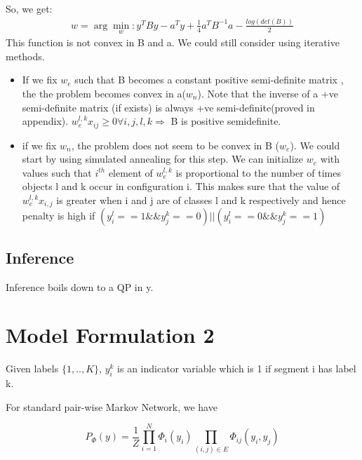\documentclass[11pt,a4paper,oneside]{report}
\begin{document}
So, we get:
\begin{eqnarray}
w=\arg\min_{w}:y^T B y-a^T y +\frac{1}{4}a^T B^{-1} a-\frac{log(det(B))}{2}
\end{eqnarray}
This function is not convex in B and a. We could still consider using iterative methods.

\begin{itemize}
\item If we fix $w_e$ such that B becomes a constant positive semi-definite matrix , the the problem becomes convex in a($w_n$). Note that the inverse of a +ve semi-definite matrix (if exists) is always +ve semi-definite(proved in appendix). $w_e^{l,k}x_{ij} \ge 0 \forall i,j,l,k \Rightarrow$ B is positive semidefinite.
\item if we fix $w_n$, the problem does not seem to be convex in B ($w_e$). We could start by using simulated annealing for this step. We can initialize $w_e$ with values such that $i^{th}$ element of $w_e^{l,k}$ is proportional to the number of times objects l and k occur in configuration i. This makes sure that the value of $w_e^{l,k}x_{i,j}$ is greater when i and j are of classes l and k respectively and hence penalty is high if  $(y_i^l==1 \&\& y_j^k==0) || (y_i^l==0 \&\& y_j^k==1)$
\end{itemize}

\subsection{Inference}
Inference boils down to a QP in y.

\section{Model Formulation 2}
Given labels $\{1,.., K\}$, $y_i^k$ is an indicator variable which is 1 if segment i has label k. 

For standard pair-wise Markov Network, we have 

\begin{equation}
  P_\Phi (y) = \frac{1}{Z} \prod_{i=1}^{N} \Phi_i(y_i) \prod_{(i,j)\in E} \Phi_{ij}(y_i,y_j)
  \end{equation}
  
\end{document}
